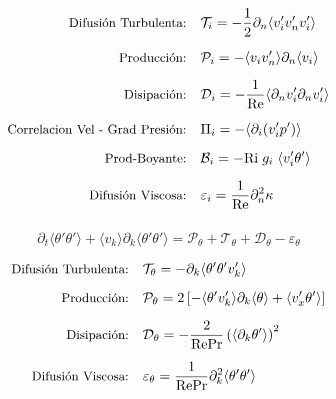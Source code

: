 \begin{equation}
\begin{aligned}
\mbox{\small Difusión Turbulenta:}\quad 
& \mathcal{T}_{i} = - \frac{1}{2} \partial_n \langle v'_i v'_n v'_i \rangle \\[2mm]
\mbox{\small Producción:}\quad 
& \mathcal{P}_{i} = - \langle v_i v'_n \rangle \partial_n \langle v_i \rangle \\[2mm]
\mbox{\small Disipación:}\quad 
& \mathcal{D}_{i} = - \frac{1}{\text{Re}} \langle \partial_n v'_i \partial_n v'_i \rangle \\[2mm]
\mbox{\small Correlacion Vel - Grad Presión:}\quad 
& \Pi_{i} = - \langle \partial_i (v'_i p') \rangle \\[2mm]
\mbox{\small Prod-Boyante:}\quad 
& \mathcal{B}_{i} = - \text{Ri} \hspace{1mm} g_i \hspace{1mm} \langle v'_i \theta' \rangle \\[2mm]
\mbox{\small Difusión Viscosa:}\quad 
& \varepsilon_{i} = \frac{1}{\text{Re}} \partial^2_n \kappa \\[2mm]
\end{aligned}
\end{equation}


\begin{equation}
\partial_t \langle \theta' \theta' \rangle + \langle v_k \rangle \partial_k \langle \theta' \theta' \rangle = \mathcal{P}_{\theta} + \mathcal{T}_{\theta} +  \mathcal{D}_{\theta} - \varepsilon_{\theta}
\end{equation}

\vspace*{-0.5cm}

\begin{equation}
\begin{aligned}
\mbox{\small Difusión Turbulenta:}\quad 
& \mathcal{T}_{\theta} = - \partial_k \langle \theta' \theta' v'_k \rangle \\[2mm]
\mbox{\small Producción:}\quad 
& \mathcal{P}_{\theta} = 2 \left[ - \langle \theta' v'_k \rangle \partial_k \langle \theta \rangle + \langle v'_x \theta' \rangle \right]  \\[2mm]
\mbox{\small Disipación:}\quad 
& \mathcal{D}_{\theta} = - \frac{2}{\text{Re} \text{Pr}} \left( \langle \partial_k \theta' \rangle \right)^2 \\[2mm]
\mbox{\small Difusión Viscosa:}\quad 
& \varepsilon_{\theta} = \frac{1}{\text{Re} \text{Pr}}  \partial^2_k \langle \theta' \theta' \rangle \\[2mm]
\end{aligned}
\end{equation}